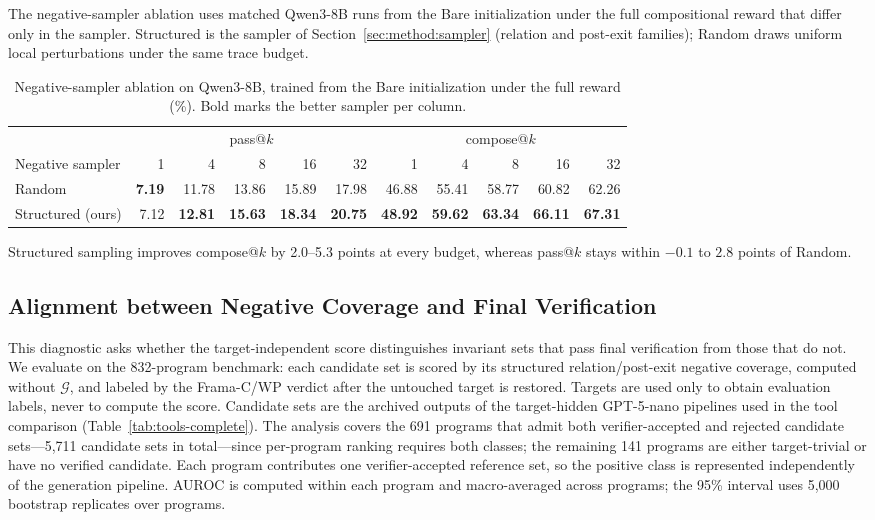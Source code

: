 The negative-sampler ablation uses matched Qwen3-8B runs from the Bare
initialization under the full compositional reward that differ only in the
sampler.  Structured is the sampler of
Section~\ref{sec:method:sampler} (relation and post-exit families); Random
draws uniform local perturbations under the same trace budget.

\begin{table}[H]
\centering
\small
\setlength{\tabcolsep}{2.4pt}
\caption{Negative-sampler ablation on Qwen3-8B, trained from the Bare
  initialization under the full reward (\%).  Bold marks the better
  sampler per column.}
\label{tab:sampler-ablation}
\begin{tabular}{lrrrrrrrrrr}
\toprule
\rowcolor{algobg}
& \multicolumn{5}{c}{pass@\(k\)} & \multicolumn{5}{c}{compose@\(k\)} \\
\headercmidrules{\cmidrule(lr){2-6}\cmidrule(lr){7-11}}
\rowcolor{algobg}
Negative sampler & 1 & 4 & 8 & 16 & 32 & 1 & 4 & 8 & 16 & 32 \\
\midrule
Random & \textbf{7.19} & 11.78 & 13.86 & 15.89 & 17.98
  & 46.88 & 55.41 & 58.77 & 60.82 & 62.26 \\
Structured (ours) & 7.12 & \textbf{12.81} & \textbf{15.63}
  & \textbf{18.34} & \textbf{20.75} & \textbf{48.92} & \textbf{59.62}
  & \textbf{63.34} & \textbf{66.11} & \textbf{67.31} \\
\bottomrule
\end{tabular}
\end{table}

Structured sampling improves compose@\(k\) by 2.0--5.3 points at every
budget, whereas pass@\(k\) stays within \(-0.1\) to \(2.8\) points of Random.

\subsection{Alignment between Negative Coverage and Final Verification}
\label{app:coverage-predictiveness}

This diagnostic asks whether the target-independent score distinguishes
invariant sets that pass final verification from those that do not.  We
evaluate on the 832-program benchmark: each candidate set is scored by its
structured relation/post-exit negative coverage, computed without
\(\mathcal G\), and labeled by the Frama-C/WP verdict after the untouched
target is restored.  Targets are used only to obtain evaluation labels,
never to compute the score.  Candidate sets are the archived outputs of the
target-hidden GPT-5-nano pipelines used in the tool comparison
(Table~\ref{tab:tools-complete}).  The analysis covers the 691 programs that admit both verifier-accepted and
rejected candidate sets---5,711 candidate sets in total---since per-program
ranking requires both classes; the remaining 141 programs are either
target-trivial or have no verified candidate.  Each program contributes one
verifier-accepted reference set, so the positive class is represented
independently of the generation pipeline.  AUROC is computed within each
program and macro-averaged across programs; the 95\% interval uses 5,000
bootstrap replicates over programs.


